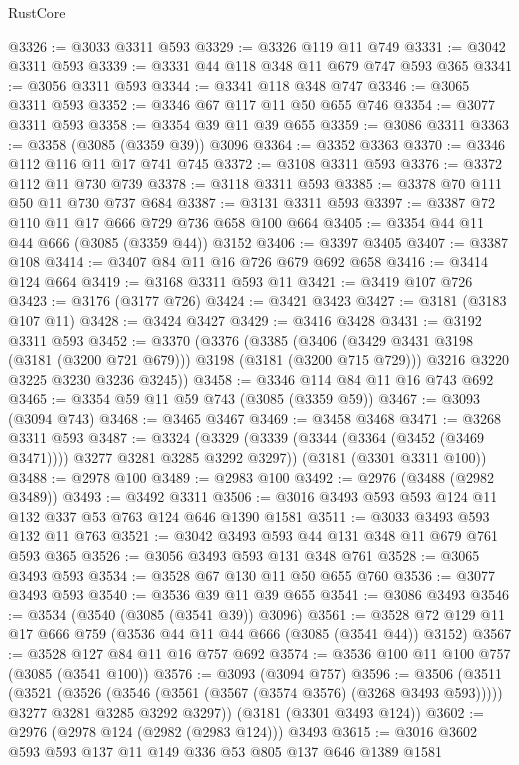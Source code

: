 \begin{lexlean}{RustCore}
\begin{coremodule}
@3326 := @3033 @3311 @593
@3329 := @3326 @119 @11 @749
@3331 := @3042 @3311 @593
@3339 := @3331 @44 @118 @348 @11 @679 @747 @593 @365
@3341 := @3056 @3311 @593
@3344 := @3341 @118 @348 @747
@3346 := @3065 @3311 @593
@3352 := @3346 @67 @117 @11 @50 @655 @746
@3354 := @3077 @3311 @593
@3358 := @3354 @39 @11 @39 @655
@3359 := @3086 @3311
@3363 := @3358 (@3085 (@3359 @39)) @3096
@3364 := @3352 @3363
@3370 := @3346 @112 @116 @11 @17 @741 @745
@3372 := @3108 @3311 @593
@3376 := @3372 @112 @11 @730 @739
@3378 := @3118 @3311 @593
@3385 := @3378 @70 @111 @50 @11 @730 @737 @684
@3387 := @3131 @3311 @593
@3397 := @3387 @72 @110 @11 @17 @666 @729 @736 @658 @100 @664
@3405 := @3354 @44 @11 @44 @666 (@3085 (@3359 @44)) @3152
@3406 := @3397 @3405
@3407 := @3387 @108
@3414 := @3407 @84 @11 @16 @726 @679 @692 @658
@3416 := @3414 @124 @664
@3419 := @3168 @3311 @593 @11
@3421 := @3419 @107 @726
@3423 := @3176 (@3177 @726)
@3424 := @3421 @3423
@3427 := @3181 (@3183 @107 @11)
@3428 := @3424 @3427
@3429 := @3416 @3428
@3431 := @3192 @3311 @593
@3452 := @3370
    (@3376
      (@3385
        (@3406 (@3429 @3431 @3198 (@3181 (@3200 @721 @679))) @3198 (@3181 (@3200 @715 @729)))
        @3216
        @3220
        @3225
        @3230
        @3236
        @3245))
@3458 := @3346 @114 @84 @11 @16 @743 @692
@3465 := @3354 @59 @11 @59 @743 (@3085 (@3359 @59))
@3467 := @3093 (@3094 @743)
@3468 := @3465 @3467
@3469 := @3458 @3468
@3471 := @3268 @3311 @593
@3487 := @3324
    (@3329 (@3339 (@3344 (@3364 (@3452 (@3469 @3471)))) @3277 @3281 @3285 @3292 @3297))
    (@3181 (@3301 @3311 @100))
@3488 := @2978 @100
@3489 := @2983 @100
@3492 := @2976 (@3488 (@2982 @3489))
@3493 := @3492 @3311
@3506 := @3016 @3493 @593 @593 @124 @11 @132 @337 @53 @763 @124 @646 @1390 @1581
@3511 := @3033 @3493 @593 @132 @11 @763
@3521 := @3042 @3493 @593 @44 @131 @348 @11 @679 @761 @593 @365
@3526 := @3056 @3493 @593 @131 @348 @761
@3528 := @3065 @3493 @593
@3534 := @3528 @67 @130 @11 @50 @655 @760
@3536 := @3077 @3493 @593
@3540 := @3536 @39 @11 @39 @655
@3541 := @3086 @3493
@3546 := @3534 (@3540 (@3085 (@3541 @39)) @3096)
@3561 := @3528 @72 @129 @11 @17 @666 @759 (@3536 @44 @11 @44 @666 (@3085 (@3541 @44)) @3152)
@3567 := @3528 @127 @84 @11 @16 @757 @692
@3574 := @3536 @100 @11 @100 @757 (@3085 (@3541 @100))
@3576 := @3093 (@3094 @757)
@3596 := @3506
    (@3511
      (@3521
        (@3526 (@3546 (@3561 (@3567 (@3574 @3576) (@3268 @3493 @593)))))
        @3277
        @3281
        @3285
        @3292
        @3297))
    (@3181 (@3301 @3493 @124))
@3602 := @2976 (@2978 @124 (@2982 (@2983 @124))) @3493
@3615 := @3016 @3602 @593 @593 @137 @11 @149 @336 @53 @805 @137 @646 @1389 @1581

\end{coremodule}
\end{lexlean}
